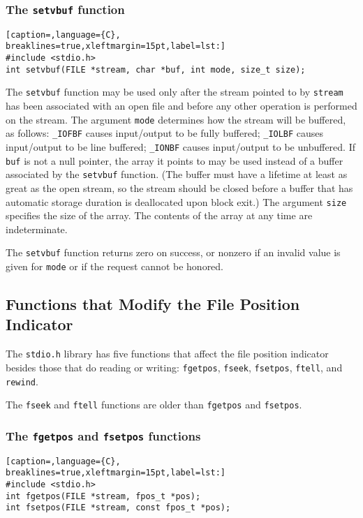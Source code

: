 \subsubsection{The \texttt{setvbuf} function}
\lstset{basicstyle=\scriptsize, numbers=left, captionpos=b, tabsize=4}
\begin{lstlisting}[caption=,language={C},
breaklines=true,xleftmargin=15pt,label=lst:]
#include <stdio.h>
int setvbuf(FILE *stream, char *buf, int mode, size_t size);
\end{lstlisting}

The \texttt{setvbuf} function may be used only after the stream pointed to by
\texttt{stream} has been associated with an open file and before any other
operation is performed on the stream. The argument \texttt{mode} determines how
the stream will be buffered, as follows: \texttt{\_IOFBF} causes input/output
to be fully buffered; \texttt{\_IOLBF} causes input/output to be line buffered;
\texttt{\_IONBF} causes input/output to be unbuffered. If \texttt{buf} is not a
null pointer, the array it points to may be used instead of a buffer associated
by the \texttt{setvbuf} function. (The buffer must have a lifetime at least as
great as the open stream, so the stream should be closed before a buffer that
has automatic storage duration is deallocated upon block exit.) The argument
\texttt{size} specifies the size of the array. The contents of the array at any
time are indeterminate.

The \texttt{setvbuf} function returns zero on success, or nonzero if an invalid
value is given for \texttt{mode} or if the request cannot be honored.

\subsection{Functions that Modify the File Position Indicator}
The \texttt{stdio.h} library has five functions that affect the file position
indicator besides those that do reading or writing: \texttt{fgetpos},
\texttt{fseek}, \texttt{fsetpos}, \texttt{ftell}, and \texttt{rewind}.

The \texttt{fseek} and \texttt{ftell} functions are older than \texttt{fgetpos}
and \texttt{fsetpos}.

\subsubsection{The \texttt{fgetpos} and \texttt{fsetpos} functions}
\lstset{basicstyle=\scriptsize, numbers=left, captionpos=b, tabsize=4}
\begin{lstlisting}[caption=,language={C},
breaklines=true,xleftmargin=15pt,label=lst:]
#include <stdio.h>
int fgetpos(FILE *stream, fpos_t *pos);
int fsetpos(FILE *stream, const fpos_t *pos);
\end{lstlisting}

